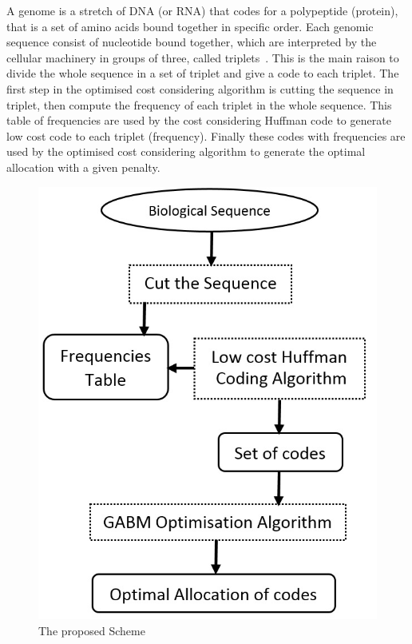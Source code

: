 \documentclass[preprint,12pt]{elsarticle}
\begin{document}
A genome is a stretch of DNA (or RNA) that codes for a polypeptide (protein), that is a set of amino acids bound together in specific order. Each genomic sequence consist of nucleotide bound together, which are interpreted by the cellular machinery in groups of three, called triplets~\cite{}. This is the main raison to divide the whole sequence in a set of triplet and give a code to each triplet. The first step in the optimised cost considering algorithm is cutting the sequence in triplet, then compute the frequency of each triplet in the whole sequence. This table of frequencies are used by the cost considering Huffman code to generate low cost code to each triplet (frequency). Finally these codes with frequencies are used by the optimised cost considering algorithm to generate the optimal allocation with a given  penalty.

\begin{figure}[h]
\begin{center}
\includegraphics[scale=0.5]{Images/Drawing3.jpg}
\caption{The proposed Scheme}
\end{center}
\label{Fig1}
\end{figure}
\end{document}
